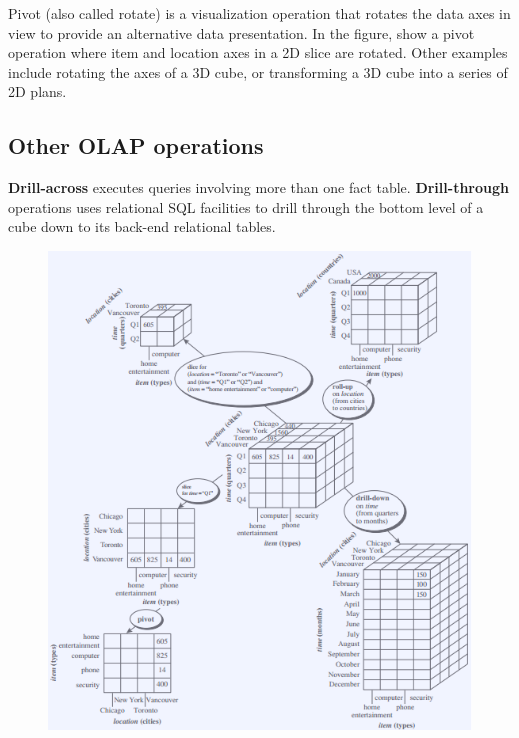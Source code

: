 			Pivot (also called rotate) is a visualization operation that rotates the data
			axes in view to provide an alternative data presentation. In the figure, show
			a pivot operation where item and location axes in a 2D slice are rotated. 
			Other examples include rotating the axes of a 3D cube, or transforming a 
			3D cube into a series of 2D plans. 

		\subsection*{Other OLAP operations}

			{\bf Drill-across} executes queries involving more than one fact table. 
			{\bf Drill-through} operations uses relational SQL facilities to drill
			through the bottom level of a cube down to its back-end relational tables. 

	\begin{figure}[H]	
		\includegraphics[width=\textwidth]{pics/operations.png}
	\end{figure}